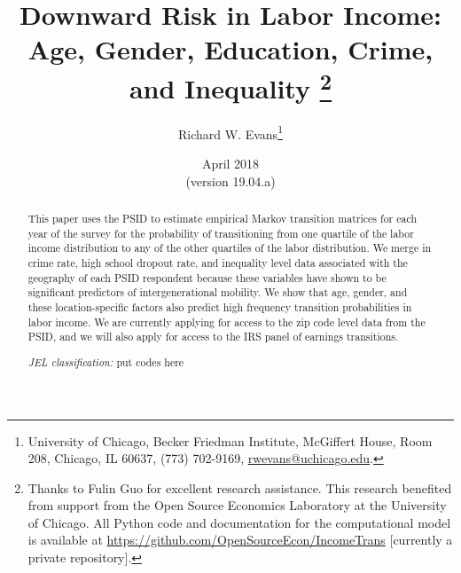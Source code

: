 \documentclass[letterpaper,12pt]{article}
\theoremstyle{definition}
\begin{document}
\begin{titlepage}
\title{
  Downward Risk in Labor Income: Age, Gender, Education, Crime, and Inequality \thanks{Thanks to Fulin Guo for excellent research assistance. This research benefited from support from the Open Source Economics Laboratory at the University of Chicago. All Python code and documentation for the computational model is available at \href{https://github.com/OpenSourceEcon/IncomeTrans}{https://github.com/OpenSourceEcon/IncomeTrans} [currently a private repository].}
}
\author{
  Richard W. Evans\footnote{University of Chicago, Becker Friedman Institute, McGiffert House, Room 208, Chicago, IL 60637, (773) 702-9169, \href{mailto:rwevans@uchicago.edu}{rwevans@uchicago.edu}.}}
\date{April 2018 \\
  \scriptsize{(version 19.04.a)}}
\maketitle
\vspace{-9mm}
\begin{abstract}
\small{This paper uses the PSID to estimate empirical Markov transition matrices for each year of the survey for the probability of transitioning from one quartile of the labor income distribution to any of the other quartiles of the labor distribution. We merge in crime rate, high school dropout rate, and inequality level data associated with the geography of each PSID respondent because these variables have shown to be significant predictors of intergenerational mobility. We show that age, gender, and these location-specific factors also predict high frequency transition probabilities in labor income. We are currently applying for access to the zip code level data from the PSID, and we will also apply for access to the IRS panel of earnings transitions.
\vspace{3mm}

%
%
\noindent\textit{JEL classification:} put codes here
}

\end{abstract}
\thispagestyle{empty}
\end{titlepage}
\end{document}
